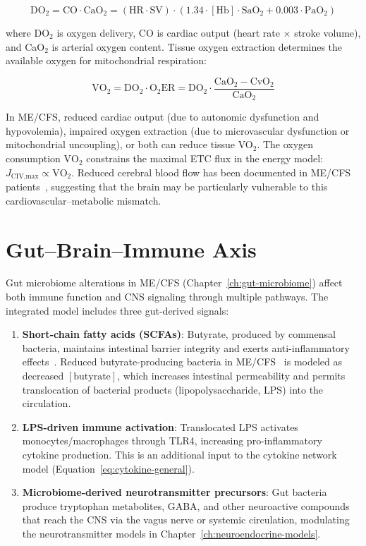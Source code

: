 \begin{equation}
\label{eq:o2-delivery}
\text{DO}_2 = \text{CO} \cdot \text{CaO}_2 = (\text{HR} \cdot \text{SV}) \cdot (1.34 \cdot [\text{Hb}] \cdot \text{SaO}_2 + 0.003 \cdot \text{PaO}_2)
\end{equation}

where DO$_2$ is oxygen delivery, CO is cardiac output (heart rate $\times$ stroke volume), and CaO$_2$ is arterial oxygen content. Tissue oxygen extraction determines the available oxygen for mitochondrial respiration:

\begin{equation}
\label{eq:o2-consumption}
\text{VO}_2 = \text{DO}_2 \cdot \text{O}_2\text{ER} = \text{DO}_2 \cdot \frac{\text{CaO}_2 - \text{CvO}_2}{\text{CaO}_2}
\end{equation}

In ME/CFS, reduced cardiac output (due to autonomic dysfunction and hypovolemia), impaired oxygen extraction (due to microvascular dysfunction or mitochondrial uncoupling), or both can reduce tissue VO$_2$. The oxygen consumption $\text{VO}_2$ constrains the maximal ETC flux in the energy model: $J_{\text{CIV,max}} \propto \text{VO}_2$. Reduced cerebral blood flow has been documented in ME/CFS patients~\cite{Novak2022CBFReview}, suggesting that the brain may be particularly vulnerable to this cardiovascular--metabolic mismatch.

\section{Gut--Brain--Immune Axis}
\label{sec:gut-brain-immune-axis}

Gut microbiome alterations in ME/CFS (Chapter~\ref{ch:gut-microbiome}) affect both immune function and CNS signaling through multiple pathways. The integrated model includes three gut-derived signals:

\begin{enumerate}
    \item \textbf{Short-chain fatty acids (SCFAs)}: Butyrate, produced by commensal bacteria, maintains intestinal barrier integrity and exerts anti-inflammatory effects~\cite{Folkerts2020butyrate}. Reduced butyrate-producing bacteria in ME/CFS~\cite{Hsu2025gut} is modeled as decreased $[\text{butyrate}]$, which increases intestinal permeability and permits translocation of bacterial products (lipopolysaccharide, LPS) into the circulation.
    \item \textbf{LPS-driven immune activation}: Translocated LPS activates monocytes/macrophages through TLR4, increasing pro-inflammatory cytokine production. This is an additional input to the cytokine network model (Equation~\ref{eq:cytokine-general}).
    \item \textbf{Microbiome-derived neurotransmitter precursors}: Gut bacteria produce tryptophan metabolites, GABA, and other neuroactive compounds that reach the CNS via the vagus nerve or systemic circulation, modulating the neurotransmitter models in Chapter~\ref{ch:neuroendocrine-models}.
\end{enumerate}

